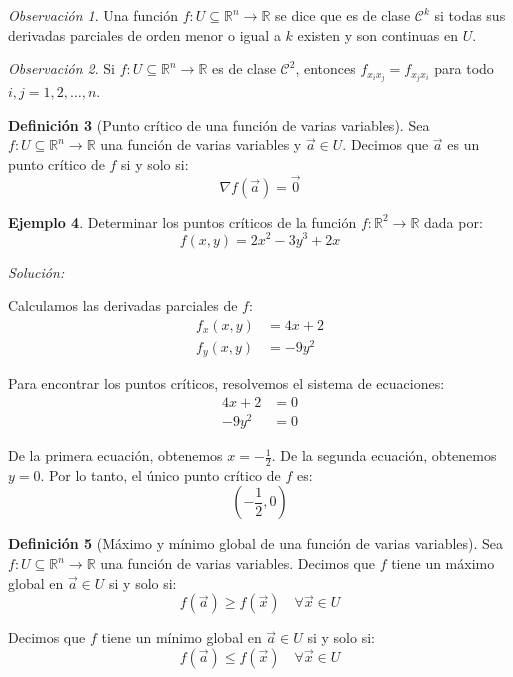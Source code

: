 \documentclass{article}
\newcommand{\R}{\mathbb{R}}
\newcommand{\vect}[1]{\vec{#1}}
\theoremstyle{definition}
\newtheorem{definition}{Definición}[section]
\newtheorem{example}[definition]{Ejemplo}
\theoremstyle{plain}
\theoremstyle{remark}
\newtheorem{remark}[definition]{Observación}
\theoremstyle{corollary}
\begin{document}
\begin{remark}
Una función $f : U \subseteq \R^n \to \R$ se dice que es de clase $\mathcal{C}^k$ si todas sus derivadas parciales de orden menor o igual a $k$ existen y son continuas en $U$.
\end{remark}

\begin{remark}
Si $f : U \subseteq \R^n \to \R$ es de clase $\mathcal{C}^2$, entonces $f_{x_i x_j} = f_{x_j x_i}$ para todo $i, j = 1, 2, \ldots, n$.
\end{remark}

\begin{definition}[Punto crítico de una función de varias variables]
Sea $f : U \subseteq \R^n \to \R$ una función de varias variables y $\vect{a} \in U$. Decimos que $\vect{a}$ es un punto crítico de $f$ si y solo si:
\[
\nabla f(\vect{a}) = \vect{0}
\]

\end{definition}

\begin{example}
Determinar los puntos críticos de la función $f : \R^2 \to \R$ dada por:
\[
f(x, y) = 2x^2 - 3y^3 + 2x
\]

\textit{Solución:}

Calculamos las derivadas parciales de $f$:
\begin{align*}
f_x(x, y) &= 4x + 2 \\
f_y(x, y) &= -9y^2
\end{align*}

Para encontrar los puntos críticos, resolvemos el sistema de ecuaciones:
\begin{align*}
4x + 2 &= 0 \\
-9y^2 &= 0
\end{align*}

De la primera ecuación, obtenemos $x = -\frac{1}{2}$. De la segunda ecuación, obtenemos $y = 0$. Por lo tanto, el único punto crítico de $f$ es:
\[
\left(-\frac{1}{2}, 0\right)
\]

\end{example}

\begin{definition}[Máximo y mínimo global de una función de varias variables]
Sea $f : U \subseteq \R^n \to \R$ una función de varias variables. Decimos que $f$ tiene un máximo global en $\vect{a} \in U$ si y solo si:
\[
f(\vect{a}) \geq f(\vect{x}) \quad \forall \vect{x} \in U
\]

Decimos que $f$ tiene un mínimo global en $\vect{a} \in U$ si y solo si:
\[
f(\vect{a}) \leq f(\vect{x}) \quad \forall \vect{x} \in U
\]

\end{definition}
\end{document}
